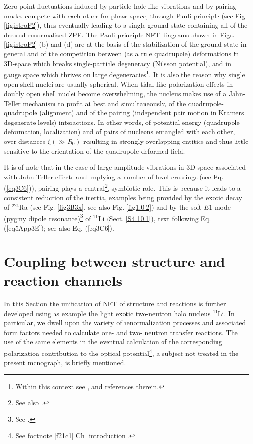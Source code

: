 Zero point fluctuations induced by particle-hole  like vibrations and by pairing modes compete with each other for phase space, through Pauli principle (see Fig. \ref{figintroF2}), thus eventually leading to a single ground state containing all of the dressed renormalized ZPF. The Pauli principle NFT diagrams shown in Figs. \ref{figintroF2} (b) and (d) are at the basis of the stabilization of the ground state in general and of the competition between (as a rule quadrupole) deformations in 3D-space which breaks single-particle degeneracy (Nilsson potential), and in gauge space which thrives on large degeneracies\footnote{Within this context see \cite{Bayman:61,Bes:69,Mottelson:62,Bohr:75}, and references therein.}. It is also the reason why single open shell nuclei are usually spherical. When tidal-like polarization effects in doubly open shell nuclei become overwhelming, the nucleus makes use of a Jahn-Teller mechanism to profit at best and simultaneously, of the quadrupole-quadrupole (alignment) and of the pairing (independent pair motion in Kramers degenerate levels) interactions. In other words, of potential energy (quadrupole deformation, localization) and of pairs of nucleons entangled with  each other, over distances $\xi (\gg R_0)$ resulting in strongly overlapping entities and thus little sensitive to the orientation of the quadrupole deformed field. 

It is of note that in the case of large amplitude vibrations in 3D-space associated with Jahn-Teller effects and implying a number of level crossings (see Eq. (\ref{eq3C6})), pairing plays a central\footnote{See also \cite{Matsuyanagi:13}.}, symbiotic role. This is because it leads to a consistent reduction of the inertia, examples being provided by the exotic decay of $^{223}$Ra (see Fig. \ref{fig3B3x}, see also Fig. \ref{fig1.0.2}) and by the soft $E1$-mode (pygmy dipole resonance)\footnote{See \cite{Broglia:19,Broglia:19c}.} of $^{11}$Li (Sect. \ref{S4.10.1}), text following Eq. (\ref{eq5App3E}); see also Eq. (\ref{eq3C6}).

\clearpage
\section[Coupling between structure and reactions]{Coupling between structure and reaction channels}\label{C1S9}
In this Section the unification of NFT of structure and reactions is further developed using as example the light exotic two-neutron halo nucleus $^{11}$Li. In particular, we dwell upon the variety of renormalization processes and associated form factors needed to calculate one- and two- neutron transfer reactions. The use of the same elements in the eventual calculation of the corresponding polarization contribution to the optical potential\footnote{\label{footnoteOM}See footnote \ref{f21c1} Ch \ref{introduction}.}, a subject not treated in the present monograph, is briefly mentioned.  
